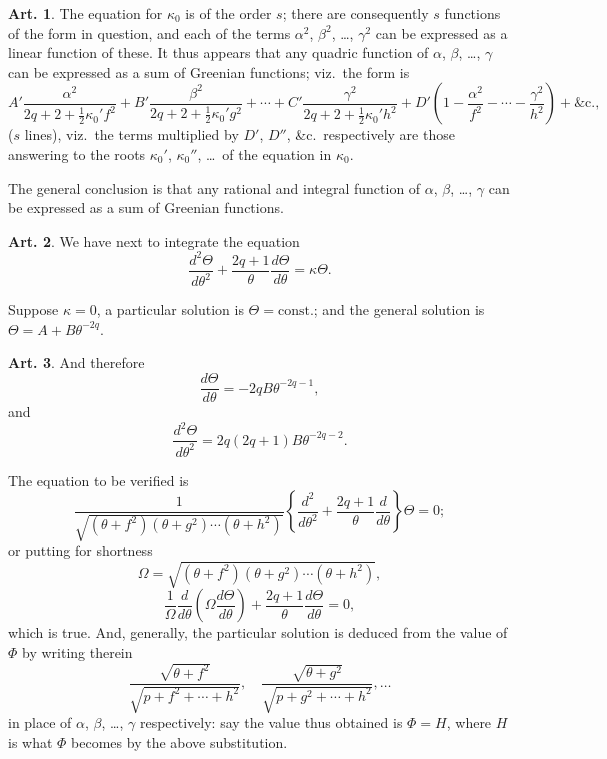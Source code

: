 \documentclass[12pt,a4paper]{article}
\theoremstyle{definition}
\newtheorem{art}{Art.}[section]
\begin{document}
\begin{art}\label{art:122}
The equation for $\kappa_0$ is of the order $s$; there are consequently $s$ functions of the form in question, and each of the terms $\alpha^2$, $\beta^2$, \ldots, $\gamma^2$ can be expressed as a linear function of these. It thus appears that any quadric function of $\alpha$, $\beta$, \ldots, $\gamma$ can be expressed as a sum of Greenian functions; viz.\ the form is
\[
A'\frac{\alpha^2}{2q+2+\frac{1}{2}\kappa_0' f^2} + B'\frac{\beta^2}{2q+2+\frac{1}{2}\kappa_0' g^2} + \cdots + C'\frac{\gamma^2}{2q+2+\frac{1}{2}\kappa_0' h^2} + D'\left(1 - \frac{\alpha^2}{f^2} - \cdots - \frac{\gamma^2}{h^2}\right) + \text{\&c.},
\]
($s$ lines), viz.\ the terms multiplied by $D'$, $D''$, \&c.\ respectively are those answering to the roots $\kappa_0'$, $\kappa_0''$, \ldots\ of the equation in $\kappa_0$.

The general conclusion is that any rational and integral function of $\alpha$, $\beta$, \ldots, $\gamma$ can be expressed as a sum of Greenian functions.
\end{art}

\begin{art}\label{art:123}
We have next to integrate the equation
\[
\frac{d^2\Theta}{d\theta^2} + \frac{2q+1}{\theta}\frac{d\Theta}{d\theta} = \kappa\Theta.
\]

Suppose $\kappa = 0$, a particular solution is $\Theta = \text{const.}$; and the general solution is $\Theta = A + B\theta^{-2q}$.
\end{art}

\begin{art}\label{art:124}
And therefore
\[
\frac{d\Theta}{d\theta} = -2qB\theta^{-2q-1},
\]
and
\[
\frac{d^2\Theta}{d\theta^2} = 2q(2q+1)B\theta^{-2q-2}.
\]

The equation to be verified is
\[
\frac{1}{\sqrt{(\theta+f^2)(\theta+g^2)\cdots(\theta+h^2)}} \left\{\frac{d^2}{d\theta^2} + \frac{2q+1}{\theta}\frac{d}{d\theta}\right\} \Theta = 0;
\]
or putting for shortness
\[
\Omega = \sqrt{(\theta+f^2)(\theta+g^2)\cdots(\theta+h^2)},
\]
\[
\frac{1}{\Omega}\frac{d}{d\theta}\left(\Omega\frac{d\Theta}{d\theta}\right) + \frac{2q+1}{\theta}\frac{d\Theta}{d\theta} = 0,
\]
which is true. And, generally, the particular solution is deduced from the value of $\Phi$ by writing therein
\[
\frac{\sqrt{\theta+f^2}}{\sqrt{p+f^2+\cdots+h^2}}, \quad \frac{\sqrt{\theta+g^2}}{\sqrt{p+g^2+\cdots+h^2}}, \ldots
\]
in place of $\alpha$, $\beta$, \ldots, $\gamma$ respectively: say the value thus obtained is $\Phi = H$, where $H$ is what $\Phi$ becomes by the above substitution.
\end{art}
\end{document}
